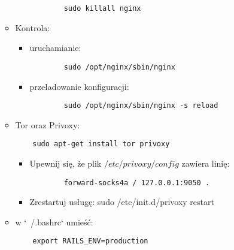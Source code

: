 \begin{itemize}
\begin{itemize}
\begin{itemize}
		\begin{verbatim}
		sudo killall nginx
		\end{verbatim}
		\end{itemize}
	\item Kontrola:
		\begin{itemize}
		\item uruchamianie:
		\begin{verbatim}
		sudo /opt/nginx/sbin/nginx
		\end{verbatim}
		\item przeładowanie konfiguracji:
		\begin{verbatim}
		sudo /opt/nginx/sbin/nginx -s reload
		\end{verbatim}
		\end{itemize}
	\item Tor oraz Privoxy:
	\begin{verbatim}
	sudo apt-get install tor privoxy
	\end{verbatim}
		\begin{itemize}
		\item Upewnij się, że plik $/etc/privoxy/config$ zawiera linię:
		\begin{verbatim}
		forward-socks4a / 127.0.0.1:9050 .
		\end{verbatim}
		\item Zrestartuj usługę:
		sudo /etc/init.d/privoxy restart
		\end{itemize}
	\item w `~/.bashrc` umieść:
	\begin{verbatim}
	export RAILS_ENV=production
	\end{verbatim}
	\end{itemize}
\end{itemize}